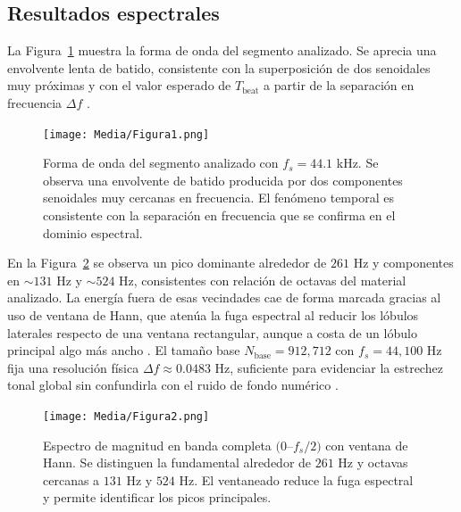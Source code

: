 \documentclass[letter,12pt]{article}
\begin{document}
\subsection{Resultados espectrales}

La Figura~\ref{fig:exp1-waveform} muestra la forma de onda del segmento analizado. Se aprecia una envolvente lenta de batido, consistente con la superposición de dos senoidales muy próximas y con el valor esperado de \(T_{\text{beat}}\) a partir de la separación en frecuencia \(\Delta f\) \cite{OppenheimSchaferDTSP3e}.  


\begin{figure}[H]
  \centering
  \texttt{[image: Media/Figura1.png]}
  \caption{Forma de onda del segmento analizado con \(f_s=44.1\) kHz. Se observa una envolvente de batido producida por dos componentes senoidales muy cercanas en frecuencia. El fenómeno temporal es consistente con la separación en frecuencia que se confirma en el dominio espectral.}
  \label{fig:exp1-waveform}
\end{figure}

En la Figura~\ref{fig:exp1-mag-full} se observa un pico dominante alrededor de \(261\) Hz y componentes en \(\sim131\) Hz y \(\sim524\) Hz, consistentes con relación de octavas del material analizado. La energía fuera de esas vecindades cae de forma marcada gracias al uso de ventana de Hann, que atenúa la fuga espectral al reducir los lóbulos laterales respecto de una ventana rectangular, aunque a costa de un lóbulo principal algo más ancho \cite{Harris1978Windows,OppenheimSchaferDTSP3e}. El tamaño base \(N_{\text{base}}=912{,}712\) con \(f_s=44{,}100\) Hz fija una resolución física \(\Delta f \approx 0.0483\) Hz, suficiente para evidenciar la estrechez tonal global sin confundirla con el ruido de fondo numérico \cite{OppenheimSchaferDTSP3e,VetterliKovacevicGoyalFSP2014}.
\begin{figure}[H]
  \centering
  \texttt{[image: Media/Figura2.png]}
  \caption{Espectro de magnitud en banda completa \((0\)–\(f_s/2)\) con ventana de Hann. Se distinguen la fundamental alrededor de \(261\) Hz y octavas cercanas a \(131\) Hz y \(524\) Hz. El ventaneado reduce la fuga espectral y permite identificar los picos principales.}
  \label{fig:exp1-mag-full}
\end{figure}
\end{document}
